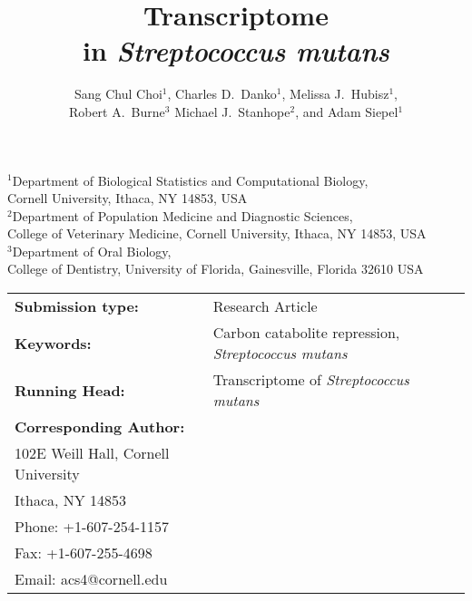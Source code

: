\documentclass{article}
\begin{document}
\begin{titlepage}

\title{Transcriptome \\
in {\em Streptococcus mutans} }

\author{Sang Chul Choi$^{1}$, Charles D.\ Danko$^{1}$, 
Melissa J.\ Hubisz$^{1}$, \\
Robert A.\ Burne$^{3}$
Michael J.\ Stanhope$^{2}$, and Adam Siepel$^{1}$}

\date{ }
\maketitle

\begin{footnotesize}
\begin{center}
$^1$Department of Biological Statistics and Computational Biology,\\
Cornell University, Ithaca, NY 14853, USA
\\[1ex]
$^2$Department of Population Medicine and Diagnostic Sciences,\\
College of Veterinary Medicine, Cornell University, Ithaca, NY 14853, USA
\\[1ex]
$^3$Department of Oral Biology,\\
College of Dentistry, University of Florida, Gainesville, Florida 32610 USA
\\
\end{center}
\end{footnotesize}

\vspace{1in}

\begin{tabular}{lp{4.5in}}
{\bf Submission type:}& Research Article
\vspace{1ex}\\
{\bf Keywords:}&Carbon catabolite repression, 
{\em Streptococcus mutans}
\vspace{1ex}\\
{\bf Running Head:}&Transcriptome of {\em Streptococcus mutans}
\vspace{1ex}\\ 
{\bf Corresponding Author:}&
\begin{minipage}[t]{4in}
 Adam Siepel\\
 102E Weill Hall, Cornell University\\
 Ithaca, NY 14853\\
 Phone: +1-607-254-1157\\
 Fax: +1-607-255-4698\\
 Email: acs4@cornell.edu
\end{minipage}
\end{tabular}

\thispagestyle{empty}
\end{titlepage}
\end{document}
